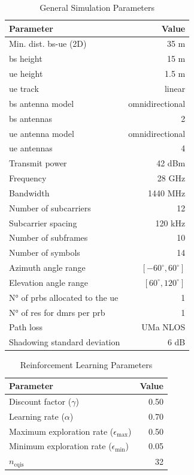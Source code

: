 \begin{table}[!htb]
	\centering
	\caption{General  Simulation Parameters}
	\label{tab:la-sim-params}
	\begin{tabularx}{0.7\columnwidth}{X r}
		\toprule
		\textbf{Parameter} 	& \textbf{Value} \\
		\midrule
		Min. dist. \gls{bs}-\gls{ue} (2D) & 35 m\\
		\gls{bs} height & 15 m\\
		\gls{ue} height & 1.5 m\\
		\gls{ue} track & linear\\
		\gls{bs}  antenna model & omnidirectional \\
		\gls{bs}  antennas & 2 \\
		\gls{ue} antenna model & omnidirectional \\
		\gls{ue} antennas & 4 \\
		Transmit power & 42 dBm\\
		Frequency & 28 GHz\\
		Bandwidth & 1440 MHz\\
		Number of subcarriers  & 12\\
		Subcarrier spacing & 120 kHz\\
		Number of subframes & 10\\
		Number of symbols & 14\\
		Azimuth angle range & $[-60^{\circ}, 60^{\circ}]$\\
		Elevation angle range & $[60^{\circ}, 120^{\circ}]$\\
        N° of \glspl{prb} allocated to the \gls{ue} & 1 \\
        N° of \glspl{re} for \gls{dmrs} per \gls{prb} & 1 \\
		Path loss & UMa NLOS\\
		Shadowing standard deviation & 6 dB\\
		\bottomrule
	\end{tabularx}
\end{table}



\begin{table}[!htb]
	\centering
	\caption{Reinforcement Learning Parameters}
	\label{tab:la-rl-params}
	\begin{tabularx}{0.6\columnwidth}{X r}
		\toprule
		\textbf{Parameter} 	 & \textbf{Value} \\
		\midrule
		Discount factor ($\gamma$)  & 0.50\\
		Learning rate ($\alpha$) & 0.70\\
		Maximum exploration rate ($\epsilon_{\max}$) & 0.50\\
		Minimum exploration rate ($\epsilon_{\min}$) & 0.05\\
		$n_{\text{cqis}}$ & 32 \\
		\bottomrule
	\end{tabularx}
\end{table}

